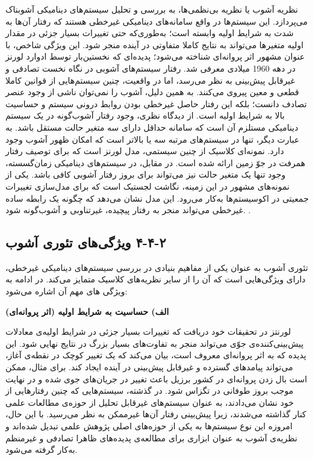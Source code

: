 نظریه آشوب یا نظریه بی‌نظمی‌ها، به بررسی و تحلیل سیستم‌های دینامیکی آشوبناک می‌پردازد. این سیستم‌ها در واقع سامانه‌های دینامیکی غیرخطی هستند که رفتار آن‌ها به شدت به شرایط اولیه وابسته است؛ به‌طوری‌که حتی تغییرات بسیار جزئی در مقدار اولیه متغیرها می‌تواند به نتایج کاملا متفاوتی در آینده منجر شود. این ویژگی شاخص، با عنوان مشهور اثر پروانه‌ای شناخته می‌شود؛ پدیده‌ای که نخستین‌بار توسط ادوارد لورنز در دهه 1960 میلادی معرفی شد. رفتار سیستم‌های آشوبی در نگاه نخست تصادفی و غیرقابل پیش‌بینی به نظر می‌رسد، اما در واقعیت، چنین سیستم‌هایی از قوانین کاملا قطعی و معین پیروی می‌کنند. به همین دلیل، آشوب را نمی‌توان ناشی از وجود عنصر تصادف دانست؛ بلکه این رفتار حاصل غیرخطی بودن روابط درونی سیستم و حساسیت بالا به شرایط اولیه است. از دیدگاه نظری، وجود رفتار آشوب‌گونه در یک سیستم دینامیکی مستلزم آن است که سامانه حداقل دارای سه متغیر حالت مستقل باشد. به عبارت دیگر، تنها در سیستم‌های مرتبه سه یا بالاتر است که امکان ظهور آشوب وجود دارد. نمونه‌ای کلاسیک از چنین سیستمی، مدل لورنز است که برای توصیف رفتار همرفت در جوّ زمین ارائه شده است. در مقابل، در سیستم‌های دینامیکی زمان‌گسسته، وجود تنها یک متغیر حالت نیز می‌تواند برای بروز رفتار آشوبی کافی باشد. یکی از نمونه‌های مشهور در این زمینه، نگاشت لجستیک است که برای مدل‌سازی تغییرات جمعیتی در اکوسیستم‌ها به‌کار می‌رود. این مدل نشان می‌دهد که چگونه یک رابطه ساده غیرخطی می‌تواند منجر به رفتار پیچیده، غیرتناوبی و آشوب‌گونه شود. \cite{ref42, ref46}.

\subsection{‏۲‏-‏۴‏-‏۴‏ ویژگی‌های تئوری آشوب}

تئوری آشوب به عنوان یکی از مفاهیم بنیادی در بررسی سیستم‌های دینامیکی غیرخطی، دارای ویژگی‌هایی است که آن را از سایر نظریه‌های کلاسیک متمایز می‌کند. در ادامه به ویژگی های مهم آن اشاره می‌شود:

\textbf{الف) حساسیت به شرایط اولیه (اثر پروانه‌ای)}

لورنتز در تحقیقات خود دریافت که تغییرات بسیار جزئی در شرایط اولیه‌ی معادلات پیش‌بینی‌کننده‌ی جوّی می‌تواند منجر به تفاوت‌های بسیار بزرگ در نتایج نهایی شود. این پدیده که به اثر پروانه‌ای معروف است، بیان می‌کند که یک تغییر کوچک در نقطه‌ی آغاز، می‌تواند پیامدهای گسترده و غیرقابل پیش‌بینی در آینده ایجاد کند. برای مثال، ممکن است بال زدن پروانه‌ای در کشور برزیل باعث تغییر در جریان‌های جوی شده و در نهایت موجب بروز طوفانی در تگزاس شود. در گذشته، سیستم‌هایی که چنین رفتارهایی از خود نشان می‌دادند، به عنوان سیستم‌های غیرقابل تحلیل از حوزه‌ی مطالعات علمی کنار گذاشته می‌شدند، زیرا پیش‌بینی رفتار آن‌ها غیرممکن به نظر می‌رسید. با این حال، امروزه این نوع سیستم‌ها به یکی از حوزه‌های اصلی پژوهش علمی تبدیل شده‌اند و نظریه‌ی آشوب به عنوان ابزاری برای مطالعه‌ی پدیده‌های ظاهرا تصادفی و غیرمنظم به‌کار گرفته می‌شود\cite{ref41}.

